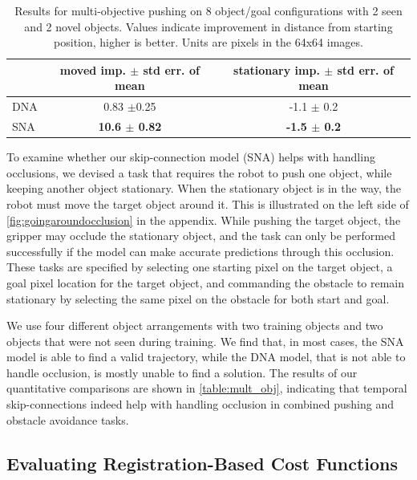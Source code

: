 \begin{table}
\centering
{\footnotesize
\begin{tabular}{lcc}
	\toprule
         &  \thead{moved imp. \\ $\pm$ std err. of mean} &   \thead{stationary imp. \\ $\pm$ std err. of mean}  \\
         \midrule
  DNA \cite{foresight} & 0.83 $\pm$0.25 &  -1.1 $\pm$ 0.2\\ 
  SNA & \textbf{10.6 $\pm$ 0.82} & \textbf{-1.5 $\pm$ 0.2} \\
  \bottomrule
\end{tabular}
}
\caption{Results for multi-objective pushing on 8 object/goal configurations with 2 seen and 2 novel objects. Values indicate improvement in distance from starting position, higher is better. Units are pixels in the 64x64 images.} 
\label{table:mult_obj}
\end{table}
To examine whether our skip-connection model (SNA) helps with handling occlusions, we devised a task that requires the robot to push one object, while keeping another object stationary. When the stationary object is in the way, the robot must move the target object around it. This is illustrated on the left side of \autoref{fig:goingaroundocclusion} in the appendix. While pushing the target object, the gripper may occlude the stationary object, and the task can only be performed successfully if the model can make accurate predictions through this occlusion. These tasks are specified by selecting one starting pixel on the target object, a goal pixel location for the target object, and commanding the obstacle to remain stationary by selecting the same pixel on the obstacle for both start and goal. 

We use four different object arrangements with two training objects and two objects that were not seen during training. We find that, in most cases, the SNA model is able to find a valid trajectory, while the DNA model, that is not able to handle occlusion, is mostly unable to find a solution. The results of our quantitative comparisons are shown in \autoref{table:mult_obj}, indicating that temporal skip-connections indeed help with handling occlusion in combined pushing and obstacle avoidance tasks. 

\subsection{Evaluating Registration-Based Cost Functions}
\label{susbsec:reg_cost_exp}

